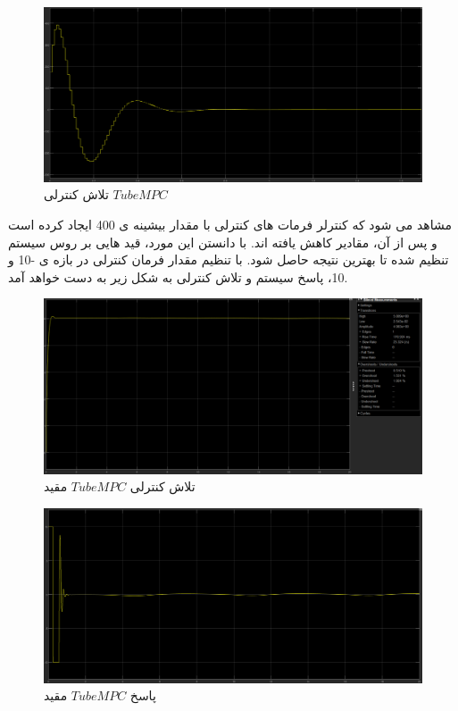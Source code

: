 \begin{figure}[H]
	\centering
	\includegraphics[width=1\linewidth]{../img/Q1_part4_Control_effort}
	\caption{تلاش کنترلی $Tube MPC$}
	\label{fig:q1part4controleffort}
\end{figure}
 
 مشاهد می شود که کنترلر فرمات های کنترلی با مقدار بیشینه ی 400 ایجاد کرده است و پس از آن، مقادیر کاهش یافته اند. با دانستن این مورد، قید هایی بر روس سیستم تنظیم شده تا بهترین نتیجه حاصل شود.
 با تنظیم مقدار فرمان کنترلی در بازه ی -10 و 10، پاسخ سیستم و تلاش کنترلی به شکل زیر به دست خواهد آمد.
\begin{figure}[H]
	\centering
	\includegraphics[width=1\linewidth]{../img/Q1_Constrained_TubeMPC_Response}
	\caption{تلاش کنترلی $Tube MPC$ مقید}
	\label{fig:q1constrainedtubempcresponse}
\end{figure}
\begin{figure}
	\centering
	\includegraphics[width=1\linewidth]{../img/Q1_Constrained_TubeMPC_Ceffort}
	\caption{پاسخ $Tube MPC$ مقید}
	\label{fig:q1constrainedtubempcceffort}
\end{figure}

